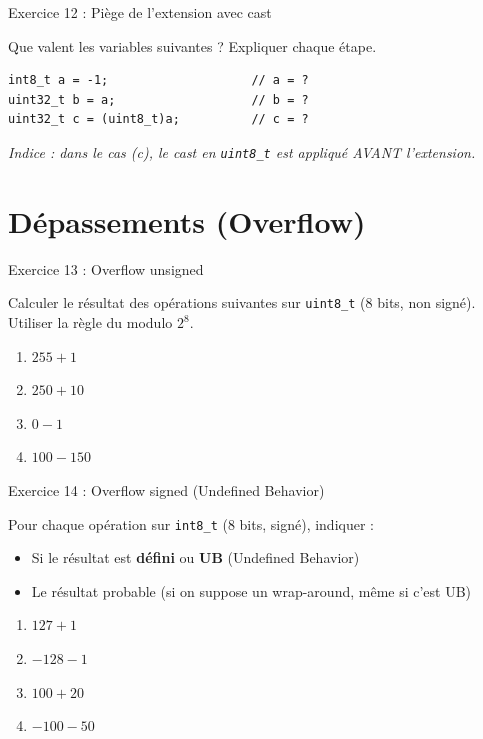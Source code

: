 \documentclass[10pt,a4paper]{article}
\begin{document}
\begin{exercicebox}{Exercice 12 : Piège de l'extension avec cast}

Que valent les variables suivantes ? Expliquer chaque étape.

\begin{lstlisting}[numbers=none]
int8_t a = -1;                    // a = ?
uint32_t b = a;                   // b = ?
uint32_t c = (uint8_t)a;          // c = ?
\end{lstlisting}

\textit{Indice : dans le cas (c), le cast en \texttt{uint8\_t} est appliqué AVANT l'extension.}
\end{exercicebox}

\section{Dépassements (Overflow)}

\begin{exercicebox}{Exercice 13 : Overflow unsigned}

Calculer le résultat des opérations suivantes sur \texttt{uint8\_t} (8 bits, non signé). Utiliser la règle du modulo $2^8$.

\begin{enumerate}[label=\alph*)]
    \item $255 + 1$
    \item $250 + 10$
    \item $0 - 1$
    \item $100 - 150$
\end{enumerate}
\end{exercicebox}

\begin{exercicebox}{Exercice 14 : Overflow signed (Undefined Behavior)}

Pour chaque opération sur \texttt{int8\_t} (8 bits, signé), indiquer :
\begin{itemize}
    \item Si le résultat est \textbf{défini} ou \textbf{UB} (Undefined Behavior)
    \item Le résultat probable (si on suppose un wrap-around, même si c'est UB)
\end{itemize}

\begin{enumerate}[label=\alph*)]
    \item $127 + 1$
    \item $-128 - 1$
    \item $100 + 20$
    \item $-100 - 50$
\end{enumerate}
\end{exercicebox}
\end{document}
